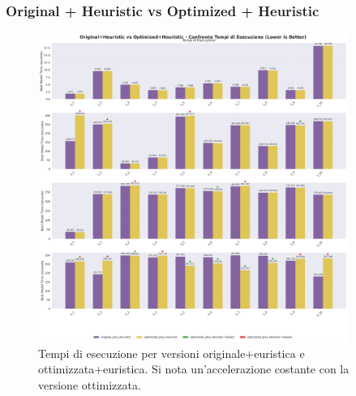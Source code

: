 \documentclass[11pt,a4paper]{article}
\begin{document}
\subsubsection{Original + Heuristic vs Optimized + Heuristic}
\begin{figure}[H]
  \centering
  \includegraphics[width=0.9\textwidth]{../Results/graphs/time_comparison_heuristic.png}
  \caption{Tempi di esecuzione per versioni originale+euristica e ottimizzata+euristica. 
  Si nota un’accelerazione costante con la versione ottimizzata.}
\end{figure}
\end{document}
